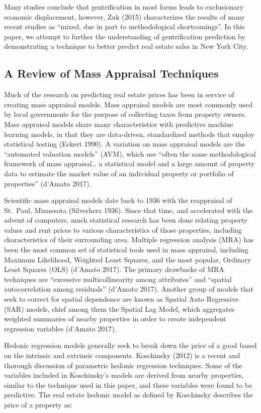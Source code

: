\documentclass[]{article}
\begin{document}
Many studies conclude that gentrification in most forms leads to
exclusionary economic displacement, however, Zuk (2015) characterizes
the results of many recent studies as ``mixed, due in part to
methodological shortcomings''. In this paper, we attempt to further the
understanding of gentrification prediction by demonstrating a technique
to better predict real estate sales in New York City.

\subsection{A Review of Mass Appraisal
Techniques}\label{a-review-of-mass-appraisal-techniques}

Much of the research on predicting real estate prices has been in
service of creating mass appraisal models. Mass appraisal models are
most commonly used by local governments for the purpose of collecting
taxes from property owners. Mass appraisal models share many
characteristics with predictive machine learning models, in that they
are data-driven, standardized methods that employ statistical testing
(Eckert 1990). A variation on mass appraisal models are the ``automated
valuation models'' (AVM), which use ``often the same methodological
framework of mass appraisal\ldots{} a statistical model and a large
amount of property data to estimate the market value of an individual
property or portfolio of properties'' (d'Amato 2017).

Scientific mass appraisal models date back to 1936 with the reappraisal
of St.~Paul, Minnesota (Silverherz 1936). Since that time, and
accelerated with the advent of computers, much statistical research has
been done relating property values and rent prices to various
characteristics of those properties, including characteristics of their
surrounding area. Multiple regression analysis (MRA) has been the most
common set of statistical tools used in mass appraisal, including
Maximum Likelihood, Weighted Least Squares, and the most popular,
Ordinary Least Squares (OLS) (d'Amato 2017). The primary drawbacks of
MRA techniques are ``excessive multicollinearity among attributes'' and
``spatial autocorrelation among residuals'' (d'Amato 2017). Another
group of models that seek to correct for spatial dependence are known as
Spatial Auto Regressive (SAR) models, chief among them the Spatial Lag
Model, which aggregates weighted summaries of nearby properties in order
to create independent regression variables (d'Amato 2017).

Hedonic regression models generally seek to break down the price of a
good based on the intrinsic and extrinsic components. Koschinsky (2012)
is a recent and thorough discussion of parametric hedonic regression
techniques. Some of the variables included in Koschinsky's models are
derived from nearby properties, similar to the technique used in this
paper, and these variables were found to be predictive. The real estate
hedonic model as defined by Koschinsky describes the price of a property
as:
\end{document}
